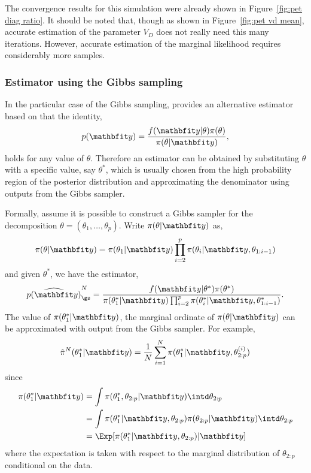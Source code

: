 \afterpage{\clearpage}

The convergence results for this simulation were already shown in Figure~\ref{fig:pet diag ratio}. It should be noted that, though as shown in Figure~\ref{fig:pet vd mean}, accurate estimation of the parameter $V_D$ does not really need this many iterations. However, accurate estimation of the marginal likelihood requires considerably more samples.

\subsubsection{Estimator using the Gibbs sampling}
\label{ssub:Estimator using the Gibbs sampling}

In the particular case of the Gibbs sampling, \cite{Chib:1995em} provides an alternative estimator based on that the identity,
\begin{equation}
  p(\data) = \frac{f(\data|\theta)\pi(\theta)}{\pi(\theta|\data)},
\end{equation}
holds for any value of $\theta$. Therefore an estimator can be obtained by substituting $\theta$ with a specific value, say $\theta^*$, which is usually chosen from the high probability region of the posterior distribution and approximating the denominator using outputs from the Gibbs sampler.

Formally, assume it is possible to construct a Gibbs sampler for the decomposition $\theta = (\theta_1,\dots,\theta_p)$. Write $\pi(\theta|\data)$ as,
\begin{equation}
  \pi(\theta|\data) = \pi(\theta_1|\data)
  \prod_{i=2}^p\pi(\theta_i|\data,\theta_{1:i-1})
\end{equation}
and given $\theta^*$, we have the estimator,
\begin{equation}
  \widehat{p(\data)}_{\gs}^N = \frac{f(\data|\theta^*)\pi(\theta^*)}
  {\pi(\theta_1^*|\data)
    \prod_{i=2}^p\pi(\theta_i^*|\data,\theta_{1:i-1}^*)}.
\end{equation}
The value of $\pi(\theta_1^*|\data)$, the marginal ordinate of $\pi(\theta|\data)$ can be approximated with output from the Gibbs sampler. For example,
\begin{equation}
  \hat\pi^N(\theta_1^*|\data)
  = \frac{1}{N}\sum_{i=1}^N \pi(\theta_1^*|\data,\theta_{2:p}^{(i)})
  \label{eq:est gibbs first}
\end{equation}
since
\begin{align*}
  \pi(\theta_1^*|\data)
  &= \int\pi(\theta_1^*, \theta_{2:p}|\data)\intd\theta_{2:p} \\
  &= \int\pi(\theta_1^*|\data,\theta_{2:p})
  \pi(\theta_{2:p}|\data)\intd\theta_{2:p} \\
  &= \Exp[\pi(\theta_1^*|\data,\theta_{2:p})|\data]
\end{align*}
where the expectation is taken with respect to the marginal distribution of $\theta_{2:p}$ conditional on the data.

